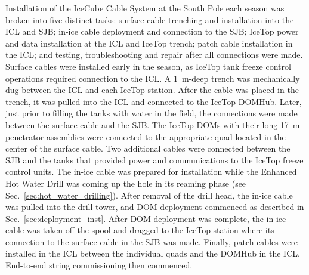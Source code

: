 Installation of the IceCube Cable System at the South Pole each season was
broken into five distinct tasks: surface cable trenching and
installation into the ICL and SJB; in-ice cable deployment and
connection to the SJB; IceTop power and data installation at the ICL and
IceTop trench; patch cable installation in the ICL; and testing,
troubleshooting and repair after all connections were made. Surface cables
were installed early in the season, as IceTop tank freeze control operations
required connection to the ICL. A 1~m-deep trench was mechanically
dug between the ICL and each IceTop station. After the cable was placed in
the trench, it was pulled into the ICL and connected to the IceTop
DOMHub. Later, just prior to filling the tanks with water in the field, the
connections were made between the surface cable and the SJB. The IceTop
DOMs with their long 17~m penetrator assemblies were connected to the
appropriate quad located in the center of the surface cable. Two additional
cables were connected between the SJB and the tanks that provided power and
communications to the IceTop freeze control units. The in-ice cable
was prepared for installation while the Enhanced Hot Water Drill was coming
up the hole in its reaming phase (see
Sec.~\ref{sec:hot_water_drilling}). After removal of the drill head, the 
in-ice cable was pulled into the drill tower, and DOM deployment
commenced as described in Sec.~\ref{sec:deployment_inst}. After DOM
deployment was complete, the in-ice cable was taken off the spool and
dragged to the IceTop station where its connection to the surface cable in the SJB was
made. Finally, patch cables were installed in the ICL between the
individual quads and the DOMHub in the ICL. End-to-end string commissioning
then commenced.
